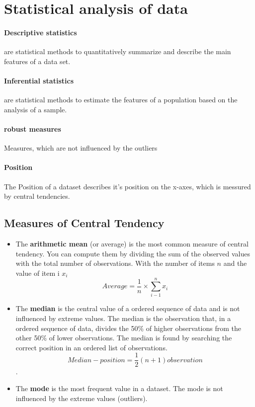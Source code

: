 \documentclass[11pt]{article}
\begin{document}
    \section{Statistical analysis of data}

    \paragraph{Descriptive statistics} are statistical methods to quantitatively summarize and describe the main features of a data set. 
    \paragraph{Inferential statistics} are statistical methods to estimate the features of a population based on the analysis of a sample. 
    \paragraph{robust measures} Measures, which are not influenced by the outliers
    \paragraph{Position} The Position of a dataset describes it's position on the x-axes, which is messured by central tendencies.

    \subsection{Measures of Central Tendency}

    \begin{itemize}
        \item The \textbf{arithmetic mean} (or average) is the most common measure of central tendency. You can compute them by dividing the sum of the observed values with the total number of observations. With the number of items $n$ and the value of item i $x_i$
        $$Average =\frac{1}{n} \times \sum_{i-1}^n x_i$$

        \item The \textbf{median} is the central value of a ordered sequence of data and is not influenced by extreme values. The median is the observation that, in a ordered sequence of data, divides the 50\% of higher observations from the other 50\% of lower observations. The median is found by searching the correct position in an ordered list of observations.
        $$Median-position = \frac{1}{2} (n+1) observation$$.

        \item The \textbf{mode} is the most frequent value in a dataset. The mode is not influenced by the extreme values (outliers).
    \end{itemize}
\end{document}
